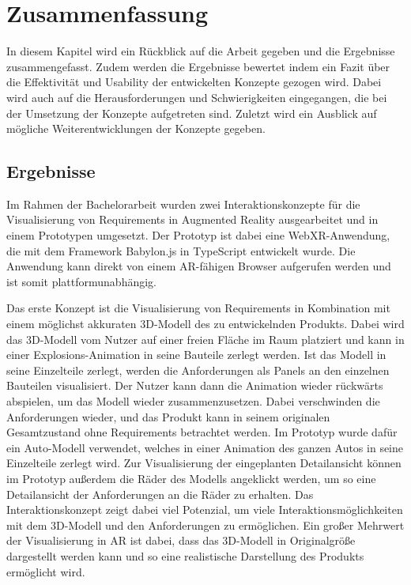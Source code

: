 \chapter{Zusammenfassung}

In diesem Kapitel wird ein Rückblick auf die Arbeit gegeben und die Ergebnisse zusammengefasst.
Zudem werden die Ergebnisse bewertet indem ein Fazit über die Effektivität und Usability der entwickelten Konzepte gezogen wird.
Dabei wird auch auf die Herausforderungen und Schwierigkeiten eingegangen, die bei der Umsetzung der Konzepte aufgetreten sind.
Zuletzt wird ein Ausblick auf mögliche Weiterentwicklungen der Konzepte gegeben.

\section{Ergebnisse}

Im Rahmen der Bachelorarbeit wurden zwei Interaktionskonzepte für die Visualisierung von Requirements in Augmented Reality ausgearbeitet und in einem Prototypen umgesetzt.
Der Prototyp ist dabei eine WebXR-Anwendung, die mit dem Framework Babylon.js in TypeScript entwickelt wurde.
Die Anwendung kann direkt von einem AR-fähigen Browser aufgerufen werden und ist somit plattformunabhängig.

Das erste Konzept ist die Visualisierung von Requirements in Kombination mit einem möglichst akkuraten 3D-Modell des zu entwickelnden Produkts.
Dabei wird das 3D-Modell vom Nutzer auf einer freien Fläche im Raum platziert und kann in einer \glqq{}Explosions\grqq{}-Animation in seine Bauteile zerlegt werden.
Ist das Modell in seine Einzelteile zerlegt, werden die Anforderungen als Panels an den einzelnen Bauteilen visualisiert.
Der Nutzer kann dann die Animation wieder rückwärts abspielen, um das Modell wieder zusammenzusetzen.
Dabei verschwinden die Anforderungen wieder, und das Produkt kann in seinem originalen Gesamtzustand ohne Requirements betrachtet werden.
Im Prototyp wurde dafür ein Auto-Modell verwendet, welches in einer Animation des ganzen Autos in seine Einzelteile zerlegt wird.
Zur Visualisierung der eingeplanten Detailansicht können im Prototyp außerdem die Räder des Modells angeklickt werden, um so eine Detailansicht der Anforderungen an die Räder zu erhalten.
Das Interaktionskonzept zeigt dabei viel Potenzial, um viele Interaktionsmöglichkeiten mit dem 3D-Modell und den Anforderungen zu ermöglichen.
Ein großer Mehrwert der Visualisierung in AR ist dabei, dass das 3D-Modell in Originalgröße dargestellt werden kann und so eine realistische Darstellung des Produkts ermöglicht wird.

